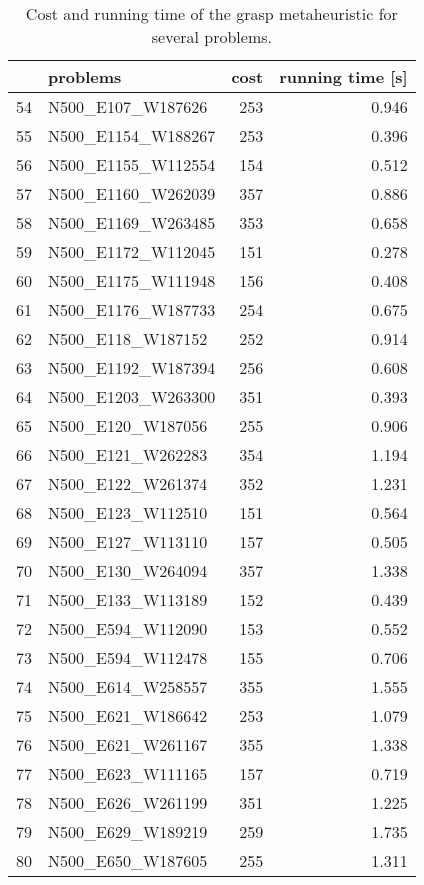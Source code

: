 \begin{table}[H]
\centering
\begin{tabular}{llrr}
\toprule
{} &            problems &  cost &  running time [s] \\
\midrule
54 &   N500\_E107\_W187626 &   253 &             0.946 \\
55 &  N500\_E1154\_W188267 &   253 &             0.396 \\
56 &  N500\_E1155\_W112554 &   154 &             0.512 \\
57 &  N500\_E1160\_W262039 &   357 &             0.886 \\
58 &  N500\_E1169\_W263485 &   353 &             0.658 \\
59 &  N500\_E1172\_W112045 &   151 &             0.278 \\
60 &  N500\_E1175\_W111948 &   156 &             0.408 \\
61 &  N500\_E1176\_W187733 &   254 &             0.675 \\
62 &   N500\_E118\_W187152 &   252 &             0.914 \\
63 &  N500\_E1192\_W187394 &   256 &             0.608 \\
64 &  N500\_E1203\_W263300 &   351 &             0.393 \\
65 &   N500\_E120\_W187056 &   255 &             0.906 \\
66 &   N500\_E121\_W262283 &   354 &             1.194 \\
67 &   N500\_E122\_W261374 &   352 &             1.231 \\
68 &   N500\_E123\_W112510 &   151 &             0.564 \\
69 &   N500\_E127\_W113110 &   157 &             0.505 \\
70 &   N500\_E130\_W264094 &   357 &             1.338 \\
71 &   N500\_E133\_W113189 &   152 &             0.439 \\
72 &   N500\_E594\_W112090 &   153 &             0.552 \\
73 &   N500\_E594\_W112478 &   155 &             0.706 \\
74 &   N500\_E614\_W258557 &   355 &             1.555 \\
75 &   N500\_E621\_W186642 &   253 &             1.079 \\
76 &   N500\_E621\_W261167 &   355 &             1.338 \\
77 &   N500\_E623\_W111165 &   157 &             0.719 \\
78 &   N500\_E626\_W261199 &   351 &             1.225 \\
79 &   N500\_E629\_W189219 &   259 &             1.735 \\
80 &   N500\_E650\_W187605 &   255 &             1.311 \\
\bottomrule
\end{tabular}
\caption{Cost and running time of the grasp metaheuristic for several problems.}
\label{table:grasp-medium-results-III}
\end{table}

